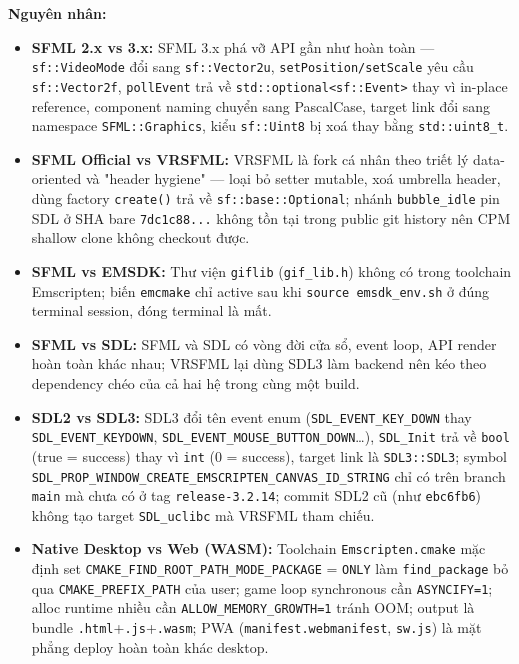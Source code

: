 \documentclass[12pt,a4paper]{article}
\begin{document}
\textbf{Nguyên nhân:}
\begin{itemize}
    \item \textbf{SFML 2.x vs 3.x:} SFML 3.x phá vỡ API gần như hoàn toàn — \texttt{sf::VideoMode} đổi sang \texttt{sf::Vector2u}, \texttt{setPosition/setScale} yêu cầu \texttt{sf::Vector2f}, \texttt{pollEvent} trả về \texttt{std::optional<sf::Event>} thay vì in-place reference, component naming chuyển sang PascalCase, target link đổi sang namespace \texttt{SFML::Graphics}, kiểu \texttt{sf::Uint8} bị xoá thay bằng \texttt{std::uint8\_t}.
    \item \textbf{SFML Official vs VRSFML:} VRSFML là fork cá nhân theo triết lý data-oriented và "header hygiene" — loại bỏ setter mutable, xoá umbrella header, dùng factory \texttt{create()} trả về \texttt{sf::base::Optional}; nhánh \texttt{bubble\_idle} pin SDL ở SHA bare \texttt{7dc1c88...} không tồn tại trong public git history nên CPM shallow clone không checkout được.
    \item \textbf{SFML vs EMSDK:} Thư viện \texttt{giflib} (\texttt{gif\_lib.h}) không có trong toolchain Emscripten; biến \texttt{emcmake} chỉ active sau khi \texttt{source emsdk\_env.sh} ở đúng terminal session, đóng terminal là mất.
    \item \textbf{SFML vs SDL:} SFML và SDL có vòng đời cửa sổ, event loop, API render hoàn toàn khác nhau; VRSFML lại dùng SDL3 làm backend nên kéo theo dependency chéo của cả hai hệ trong cùng một build.
    \item \textbf{SDL2 vs SDL3:} SDL3 đổi tên event enum (\texttt{SDL\_EVENT\_KEY\_DOWN} thay \texttt{SDL\_EVENT\_KEYDOWN}, \texttt{SDL\_EVENT\_\allowbreak MOUSE\_BUTTON\_DOWN}\dots), \texttt{SDL\_Init} trả về \texttt{bool} (true = success) thay vì \texttt{int} (0 = success), target link là \texttt{SDL3::SDL3}; symbol \texttt{SDL\_PROP\_\allowbreak WINDOW\_CREATE\_\allowbreak EMSCRIPTEN\_\allowbreak CANVAS\_ID\_STRING} chỉ có trên branch \texttt{main} mà chưa có ở tag \texttt{release-3.2.14}; commit SDL2 cũ (như \texttt{ebc6fb6}) không tạo target \texttt{SDL\_uclibc} mà VRSFML tham chiếu.
    \item \textbf{Native Desktop vs Web (WASM):} Toolchain \texttt{Emscripten.cmake} mặc định set \texttt{CMAKE\_FIND\_ROOT\_PATH\_MODE\_PACKAGE} = \texttt{ONLY} làm \texttt{find\_package} bỏ qua \texttt{CMAKE\_PREFIX\_PATH} của user; game loop synchronous cần \texttt{ASYNCIFY=1}; alloc runtime nhiều cần \texttt{ALLOW\_MEMORY\_GROWTH=1} tránh OOM; output là bundle \texttt{.html}+\texttt{.js}+\texttt{.wasm}; PWA (\texttt{manifest.webmanifest}, \texttt{sw.js}) là mặt phẳng deploy hoàn toàn khác desktop.

\end{itemize}
\end{document}
